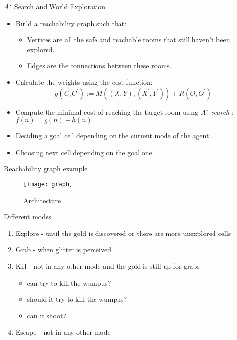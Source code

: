 \documentclass[smaller,dvipsnames,ratio=169]{beamer}
\begin{document}
  \begin{frame}{$A^{\star}$ Search and World Exploration}
	 \begin{itemize}
	 	\item Build a reachability graph such that:
		 	\begin{itemize}
				 \item Vertices are all the safe and reachable rooms that still haven't been explored.
				 \item Edges are the connections between these rooms.
		    \end{itemize}
	    \item Calculate the weights using the cost function: 
	    $$
	    g(C,C^\prime) := M((X,Y),(X^\prime,Y^\prime)) + R(O,O^\prime)
	    $$
	    \item Compute the minimal cost of reaching the target room using \emph{$A^{\star}$ search} : 
	    \(f(n) = g(n) + h(n)\)
	    \item Deciding a goal cell depending on the current mode of the agent .
	    \item Choosing next cell depending on the goal one.
		 
	 \end{itemize}
  \end{frame}

\begin{frame}{Reachability graph example}
	\begin{figure}\centering
		\texttt{[image: graph]}
		\caption{Architecture }
	\end{figure}
\end{frame}


  \begin{frame}{Different modes}
   \begin{enumerate}
   	\item Explore - until the gold is discovered or there are more unexplored cells 
   	\item Grab - when glitter is perceived
   	\item Kill - not in any other mode and the gold is still up for grabs
		   	\begin{itemize}
		   		\item can try to kill the wumpus?
		   		\item should it try to kill the wumpus?
		   		\item can it shoot?
		   	\end{itemize}
   	\item Escape - not in any other mode
   \end{enumerate}
  \end{frame}
\end{document}
